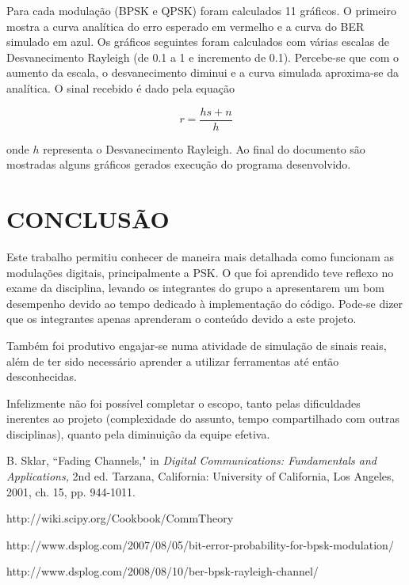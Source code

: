 \documentclass[a4paper,twocolumn]{article}
\begin{document}
Para cada modulação (BPSK e QPSK) foram calculados 11 gráficos. O primeiro mostra a curva analítica do erro esperado em vermelho e a curva do BER simulado em azul. Os gráficos seguintes foram calculados com várias escalas de Desvanecimento Rayleigh (de 0.1 a 1 e incremento de 0.1). Percebe-se que com o aumento da escala, o desvanecimento diminui e a curva simulada aproxima-se da analítica. O sinal recebido é dado pela equação

\begin{equation}
    \label{eq:signal_rayleigh}
    r = \frac{hs + n}{h}
\end{equation}

\noindent onde $h$ representa o Desvanecimento Rayleigh. Ao final do documento são mostradas alguns gráficos gerados execução do programa desenvolvido.


\section{CONCLUSÃO}

Este trabalho permitiu conhecer de maneira mais detalhada como funcionam as modulações digitais, principalmente a PSK. O que foi aprendido teve reflexo no exame da disciplina, levando os integrantes do grupo a apresentarem um bom desempenho devido ao tempo dedicado à implementação do código. Pode-se dizer que os integrantes apenas aprenderam o conteúdo devido a este projeto.

Também foi produtivo engajar-se numa atividade de simulação de sinais reais, além de ter sido necessário aprender a utilizar ferramentas até então desconhecidas.

Infelizmente não foi possível completar o escopo, tanto pelas dificuldades inerentes ao projeto (complexidade do assunto, tempo compartilhado com outras disciplinas), quanto pela diminuição da equipe efetiva.


\begin{thebibliography}{9}
        B. Sklar,
        ``Fading Channels,"
        in \textit{Digital Communications: Fundamentals and Applications,}
        2nd ed.
        Tarzana, California: University of California, Los Angeles,
        2001, ch. 15, pp. 944-1011.

        http://wiki.scipy.org/Cookbook/CommTheory

        http://www.dsplog.com/2007/08/05/bit-error-probability-for-bpsk-modulation/

        http://www.dsplog.com/2008/08/10/ber-bpsk-rayleigh-channel/
\end{thebibliography}
\end{document}
